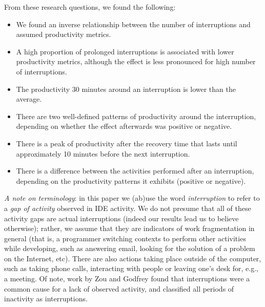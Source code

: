 \documentclass[times]{smrauth}
\newcommand\RR[1]{\textbf{Romain #1}}
\begin{document}
From these research questions, we found the following:
\begin{itemize}
	\item We found an inverse relationship between the number of interruptions and assumed productivity metrics.
	\item A high proportion of prolonged interruptions is associated with lower productivity metrics, although the effect is less pronounced for high number of interruptions.
	\item The productivity 30 minutes around an interruption is lower than the average.
	\item There are two well-defined patterns of productivity around the interruption, depending on whether the effect afterwards was positive or negative.
	\item There is a peak of productivity after the recovery time that lasts until approximately 10 minutes before the next interruption.
	\item There is a difference between the activities performed after an interruption, depending on the productivity patterns it exhibits (positive or negative).
\end{itemize}


\emph{A note on terminology}: in this paper we (ab)use the word \emph{interruption} to refer to a \emph{gap of activity} observed in IDE activity. We do not presume that all of these activity gaps are actual interruptions (indeed our results lead us to believe otherwise); rather, we assume that they are indicators of work fragmentation in general (that is, a programmer switching contexts to perform other activities while developing, such as answering email, looking for the solution of a problem on the Internet, etc). 
There are also actions taking place outside of the computer, such as taking phone calls, interacting with people or leaving one's desk for, e.g., a meeting. 
Of note, work by Zou and Godfrey \cite{ZG06} found that interruptions were a common cause for a lack of observed activity, and classified all periods of inactivity as interruptions. %
\end{document}

